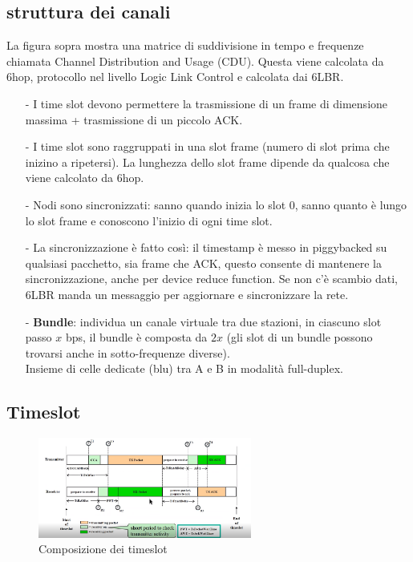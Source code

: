 \documentclass[12pt,italian]{report}
\begin{document}
\subsection{struttura dei canali}
La figura sopra mostra una matrice di suddivisione in tempo e frequenze chiamata Channel Distribution and Usage (CDU). Questa viene calcolata da 6hop, protocollo nel livello Logic Link Control e calcolata dai 6LBR. 
\begin{itemize}
    \item [-] I time slot devono permettere la trasmissione di un frame di dimensione massima + trasmissione di un piccolo ACK. 
    \item [-] I time slot sono raggruppati in una slot frame (numero di slot prima che inizino a ripetersi). La lunghezza dello slot frame dipende da qualcosa che viene calcolato da 6hop.
    \item [-] Nodi sono sincronizzati: sanno quando inizia lo slot 0, sanno quanto è lungo lo slot frame e conoscono l'inizio di ogni time slot.
    \item [-] La sincronizzazione è fatto così: il timestamp è messo in piggybacked su qualsiasi pacchetto, sia frame che ACK, questo consente di mantenere la sincronizzazione, anche per device reduce function. Se non c'è scambio dati, 6LBR manda un messaggio per aggiornare e sincronizzare la rete. 
    \item [-] \textbf{Bundle}: individua un canale virtuale tra due stazioni, in ciascuno slot passo $x$ bps, il bundle è composta da $2x$ (gli slot di un bundle possono trovarsi anche in sotto-frequenze diverse). \\ Insieme di celle dedicate (blu) tra A e B in modalità full-duplex. 
\end{itemize}

\subsection{Timeslot}
\begin{figure}[h]
\centering
\includegraphics[width=70mm]{img/timeslot.PNG}
\caption{Composizione dei timeslot}
\label{fig:frefe}
\end{figure}
\end{document}
